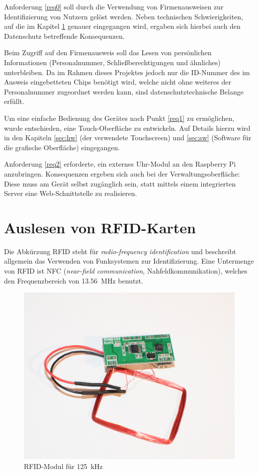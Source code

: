 \documentclass[11pt,a4paper]{IEEEtran}
\begin{document}
Anforderung \ref{req0} soll durch die Verwendung von Firmenausweisen zur
Identifizierung von Nutzern gelöst werden. Neben technischen Schwierigkeiten,
auf die im Kapitel \ref{sec:rfid} genauer eingegangen wird, ergaben sich
hierbei auch den Datenschutz betreffende Konsequenzen.

Beim Zugriff auf den Firmenausweis soll das Lesen von persönlichen
Informationen (Personalnummer, Schließberechtigungen und ähnliches)
unterbleiben. Da im Rahmen dieses Projektes jedoch nur die ID-Nummer des im
Ausweis eingebetteten Chips benötigt wird, welche nicht ohne weiteres der
Personalnummer zugeordnet werden kann, sind datenschutztechnische Belange
erfüllt.

Um eine einfache Bedienung des Gerätes nach Punkt \ref{req1} zu ermöglichen,
wurde entschieden, eine Touch-Oberfläche zu entwickeln. Auf Details hierzu wird
in den Kapiteln \ref{sec:hw} (der verwendete Touchscreen) und \ref{sec:sw}
(Software für die grafische Oberfläche) eingegangen.

Anforderung \ref{req2} erforderte, ein externes Uhr-Modul an den Raspberry Pi
anzubringen. Konsequenzen ergeben sich auch bei der Verwaltungsoberfläche:
Diese muss am Gerät selbst zugänglich sein, statt mittels einem integrierten 
Server eine Web-Schnittstelle zu realisieren.

\section{Auslesen von RFID-Karten} \label{sec:rfid}

Die Abkürzung RFID steht für \emph{radio-frequency identification} und
beschreibt allgemein das Verwenden von Funksystemen zur Identifizierung. Eine
Untermenge von RFID ist NFC (\emph{near-field communication},
Nahfeldkommunikation), welches den Frequenzbereich von \SI{13,56}{\mega\hertz}
benutzt.

\begin{figure}[ht]
    \centering
    \includegraphics[width=.8\columnwidth]{images/125khz_rfid}
    \caption{RFID-Modul für \SI{125}{\kilo\hertz}}
    \label{fig:rfid125khz}
\end{figure}
\end{document}

